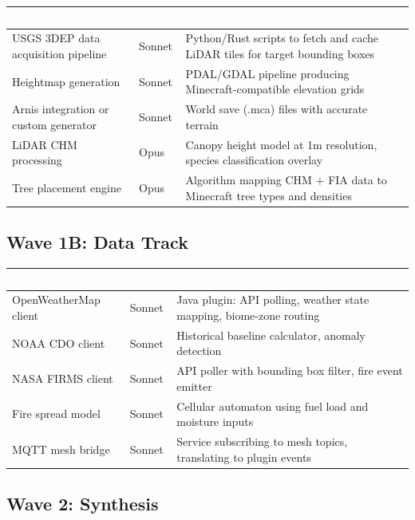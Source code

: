 \documentclass[11pt,letterpaper]{article}
\newcommand{\tableheader}[1]{\textbf{\sffamily\textcolor{white}{#1}}}
\begin{document}
\begin{center}
\begin{tabularx}{\textwidth}{L{3cm}C{1.5cm}X}
\toprule
{}
\tableheader{Task} & \tableheader{Model} & \tableheader{Output} \\
\midrule
USGS 3DEP data acquisition pipeline & Sonnet & Python/Rust scripts to fetch and cache LiDAR tiles for target bounding boxes \\
Heightmap generation & Sonnet & PDAL/GDAL pipeline producing Minecraft-compatible elevation grids \\
Arnis integration or custom generator & Sonnet & World save (.mca) files with accurate terrain \\
LiDAR CHM processing & Opus & Canopy height model at 1m resolution, species classification overlay \\
Tree placement engine & Opus & Algorithm mapping CHM + FIA data to Minecraft tree types and densities \\
\bottomrule
\end{tabularx}
\end{center}

\subsection{Wave 1B: Data Track}

\begin{center}
\begin{tabularx}{\textwidth}{L{3cm}C{1.5cm}X}
\toprule
{}
\tableheader{Task} & \tableheader{Model} & \tableheader{Output} \\
\midrule
OpenWeatherMap client & Sonnet & Java plugin: API polling, weather state mapping, biome-zone routing \\
NOAA CDO client & Sonnet & Historical baseline calculator, anomaly detection \\
NASA FIRMS client & Sonnet & API poller with bounding box filter, fire event emitter \\
Fire spread model & Sonnet & Cellular automaton using fuel load and moisture inputs \\
MQTT mesh bridge & Sonnet & Service subscribing to mesh topics, translating to plugin events \\
\bottomrule
\end{tabularx}
\end{center}

\subsection{Wave 2: Synthesis}
\end{document}
